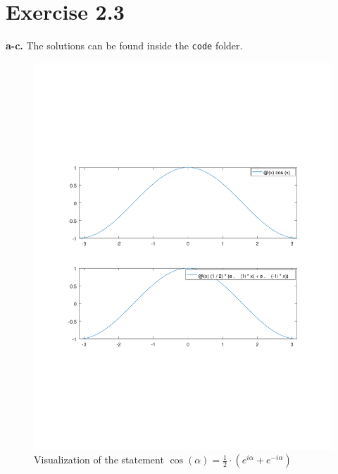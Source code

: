 \documentclass[12pt]{article}
\begin{document}
	\section*{Exercise 2.3}
	\textbf{a-c.} The solutions can be found inside the \texttt{code} folder.
	\begin{figure}[H]
	\label{plot}
	\centering
	\includegraphics[width=\textwidth]{3c.pdf}
	\caption{Visualization of the statement $\cos(\alpha) = \frac{1}{2} \cdot (e^{i\alpha} + e^{-i\alpha})$ }
	\end{figure}
\end{document}
